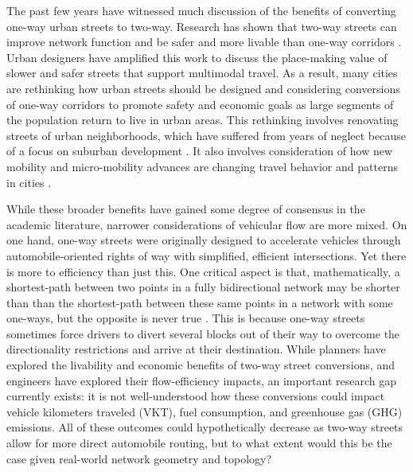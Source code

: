 \documentclass{trbunofficial}
\begin{document}
The past few years have witnessed much discussion of the benefits of converting one-way urban streets to two-way. Research has shown that two-way streets can improve network function \cite{gayah_two-way_2012,gayah_analytical_2012} and be safer and more livable than one-way corridors \cite{riggs_two-way_2016}. Urban designers have amplified this work to discuss the place-making value of slower and safer streets that support multimodal travel. As a result, many cities are rethinking how urban streets should be designed and considering conversions of one-way corridors to promote safety and economic goals as large segments of the population return to live in urban areas. This rethinking involves renovating streets of urban neighborhoods, which have suffered from years of neglect because of a focus on suburban development \cite{dover_street_2013,duany_suburban_2001}. It also involves consideration of how new mobility and micro-mobility advances are changing travel behavior and patterns in cities \cite{clewlow_disruptive_2017,clewlow_micro-mobility_2018,riggs_disruptive_2019,shaheen_shared_2018}.

While these broader benefits have gained some degree of consensus in the academic literature, narrower considerations of vehicular flow are more mixed. On one hand, one-way streets were originally designed to accelerate vehicles through automobile-oriented rights of way with simplified, efficient intersections. Yet there is more to efficiency than just this. One critical aspect is that, mathematically, a shortest-path between two points in a fully bidirectional network may be shorter than than the shortest-path between these same points in a network with some one-ways, but the opposite is never true \cite{ortigosa_analysis_2019}. This is because one-way streets sometimes force drivers to divert several blocks out of their way to overcome the directionality restrictions and arrive at their destination. While planners have explored the livability and economic benefits of two-way street conversions, and engineers have explored their flow-efficiency impacts, an important research gap currently exists: it is not well-understood how these conversions could impact vehicle kilometers traveled (VKT), fuel consumption, and greenhouse gas (GHG) emissions. All of these outcomes could hypothetically decrease as two-way streets allow for more direct automobile routing, but to what extent would this be the case given real-world network geometry and topology?
\end{document}
